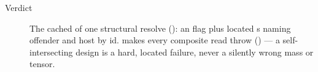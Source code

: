 \begin{description}
\item[Verdict] The cached  of one structural resolve
  (): an  flag plus located
  s naming offender and host by id.  makes
  every composite read throw () --- a
  self-intersecting design is a hard, located failure, never a silently wrong mass or
  tensor.

\end{description}
